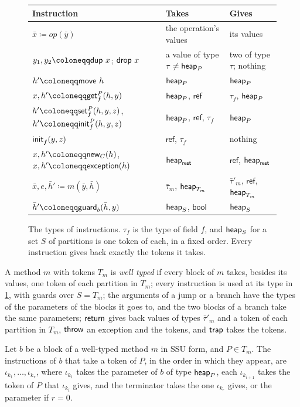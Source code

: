 \begin{figure}[t]
\centering
\begin{tabular}{@{}lll@{}}
\toprule
Instruction & Takes & Gives \\
\midrule
$\bar x \coloneqq \mathit{op}(\bar y)$ & the operation's values & its values \\
$y_1, y_2 \coloneqq \dup\ x$; $\drop\ x$ & a value of type $\tau \neq \mathsf{heap}_{P}$ & two of type $\tau$; nothing \\
$h' \coloneqq \move\ h$ & $\mathsf{heap}_{P}$ & $\mathsf{heap}_{P}$ \\
$x, h' \coloneqq \getf{f}{P}(h, y)$ & $\mathsf{heap}_{P}$, $\mathsf{ref}$ & $\tau_f$, $\mathsf{heap}_{P}$ \\
$h' \coloneqq \setf{f}{P}(h, y, z)$, $h' \coloneqq \initf{f}{P}(h, y, z)$ & $\mathsf{heap}_{P}$, $\mathsf{ref}$, $\tau_f$ & $\mathsf{heap}_{P}$ \\
$\mathsf{init}^{}_{f}(y, z)$ & $\mathsf{ref}$, $\tau_f$ & nothing \\
$x, h' \coloneqq \newc{C}(h)$, $x, h' \coloneqq \exn(h)$ & $\mathsf{heap}_{\mathsf{rest}}$ & $\mathsf{ref}$, $\mathsf{heap}_{\mathsf{rest}}$ \\
$\bar x, e, \bar h' \coloneqq m(\bar y, \bar h)$ & $\bar\tau_m$, $\mathsf{heap}_{T_m}$ & $\bar\tau'_m$, $\mathsf{ref}$, $\mathsf{heap}_{T_m}$ \\
$\bar h' \coloneqq \guard_b(\bar h, y)$ & $\mathsf{heap}_{S}$, $\mathsf{bool}$ & $\mathsf{heap}_{S}$ \\
\bottomrule
\end{tabular}
\caption{The types of instructions. $\tau_f$ is the type of field $f$, and
$\mathsf{heap}_{S}$ for a set $S$ of partitions is one token of each, in a fixed order.
Every instruction gives back exactly the tokens it takes.}
\label{fig:ee-types}
\end{figure}

\begin{definition}\label{def:ee-typed}
A method $m$ with tokens $T_m$ is \emph{well typed} if every block of $m$
takes, besides its values, one token of each partition in $T_m$; every
instruction is used at its type in \cref{fig:ee-types}, with guards over
$S = T_m$; the arguments of a jump or a branch have the types of the
parameters of the blocks it goes to, and the two blocks of a branch take the
same parameters; $\mathsf{return}$ gives back values of types $\bar\tau'_m$ and a token of
each partition in $T_m$, $\mathsf{throw}$ an exception and the tokens, and $\mathsf{trap}$
takes the tokens.
\end{definition}

\begin{lemma}[Chains]\label{lem:ee-chains}
Let $b$ be a block of a well-typed method $m$ in SSU form, and $P \in T_m$. The
instructions of $b$ that take a token of $P$, in the order in which they appear,
are $\iota_{k_1}, \ldots, \iota_{k_r}$, where $\iota_{k_1}$ takes the parameter
of $b$ of type $\mathsf{heap}_{P}$, each $\iota_{k_{i+1}}$ takes the token of $P$ that
$\iota_{k_i}$ gives, and the terminator takes the one $\iota_{k_r}$ gives, or
the parameter if $r = 0$.
\end{lemma}

